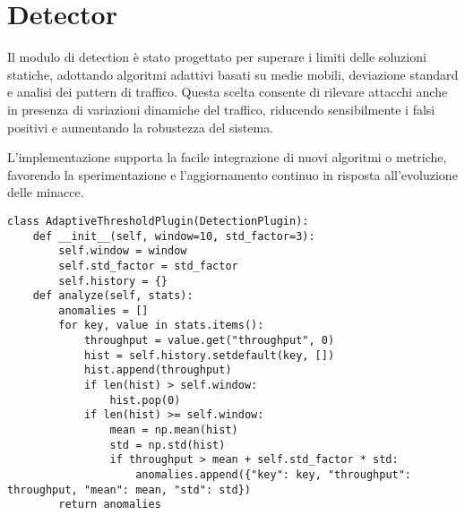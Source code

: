 \section{Detector}
Il modulo di detection è stato progettato per superare i limiti delle soluzioni statiche, adottando algoritmi adattivi basati su medie mobili, deviazione standard e analisi dei pattern di traffico. Questa scelta consente di rilevare attacchi anche in presenza di variazioni dinamiche del traffico, riducendo sensibilmente i falsi positivi e aumentando la robustezza del sistema.\par
L'implementazione supporta la facile integrazione di nuovi algoritmi o metriche, favorendo la sperimentazione e l'aggiornamento continuo in risposta all'evoluzione delle minacce.
\begin{verbatim}
class AdaptiveThresholdPlugin(DetectionPlugin):
    def __init__(self, window=10, std_factor=3):
        self.window = window
        self.std_factor = std_factor
        self.history = {}
    def analyze(self, stats):
        anomalies = []
        for key, value in stats.items():
            throughput = value.get("throughput", 0)
            hist = self.history.setdefault(key, [])
            hist.append(throughput)
            if len(hist) > self.window:
                hist.pop(0)
            if len(hist) >= self.window:
                mean = np.mean(hist)
                std = np.std(hist)
                if throughput > mean + self.std_factor * std:
                    anomalies.append({"key": key, "throughput": throughput, "mean": mean, "std": std})
        return anomalies
\end{verbatim}

